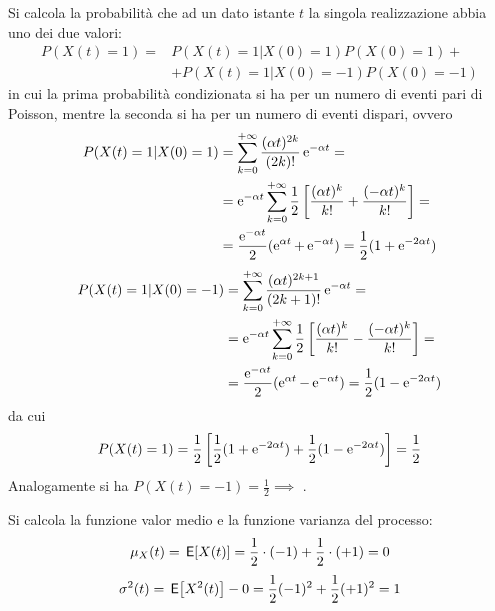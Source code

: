 Si calcola la probabilità che ad un dato istante $t$ la singola realizzazione abbia uno dei due valori:
\begin{equation}\begin{split}P(X(t)=1)=&P(X(t)=1|X(0)=1)P(X(0)=1)+\\&+P(X(t)=1|X(0)=-1)P(X(0)=-1)\end{split}\end{equation}
in cui la prima probabilità condizionata si ha per un numero di eventi pari di Poisson, mentre la seconda si ha per un numero di eventi dispari, ovvero
\begin{equation}\begin{split}P(X(t)=1|X(0)=1)&=\sum_{k=0}^{+\infty}{\frac{(\alpha t)^{2k}}{(2k)!}\operatorname{e}^{-\alpha t}}=\\
&=\operatorname{e}^{-\alpha t}\sum_{k=0}^{+\infty}{\frac{1}{2}\left[\frac{(\alpha t)^k}{k!}+\frac{(-\alpha t)^k}{k!}\right]}=\\
&=\frac{\operatorname{e}^{-\alpha t}}{2}(\operatorname{e}^{\alpha t}+\operatorname{e}^{-\alpha t})=\frac{1}{2}(1+\operatorname{e}^{-2\alpha t})
\end{split}\end{equation}
\begin{equation}\begin{split}P(X(t)=1|X(0)=-1)&=\sum_{k=0}^{+\infty}{\frac{(\alpha t)^{2k+1}}{(2k+1)!}\operatorname{e}^{-\alpha t}}=\\
&=\operatorname{e}^{-\alpha t}\sum_{k=0}^{+\infty}{\frac{1}{2}\left[\frac{(\alpha t)^k}{k!}-\frac{(-\alpha t)^k}{k!}\right]}=\\
&=\frac{\operatorname{e}^{-\alpha t}}{2}(\operatorname{e}^{\alpha t}-\operatorname{e}^{-\alpha t})=\frac{1}{2}(1-\operatorname{e}^{-2\alpha t})
\end{split}\end{equation}
da cui
\begin{equation}P(X(t)=1)=\frac{1}{2}\left[\frac{1}{2}(1+\operatorname{e}^{-2\alpha t})+\frac{1}{2}(1-\operatorname{e}^{-2\alpha t})\right]=\frac{1}{2}\end{equation}
Analogamente si ha $P(X(t)=-1)=\frac{1}{2} \implies$ .

Si calcola la funzione valor medio e la funzione varianza del processo:
\begin{equation}\mu_X(t)=\,{\operatorname{\mathsf{E}}}\!\left[{X(t)}\right]=\frac{1}{2}\cdot(-1)+\frac{1}{2}\cdot(+1)=0\end{equation}
\begin{equation}\sigma^2(t)=\,{\operatorname{\mathsf{E}}}\!\left[{X^2(t)}\right]-0=\frac{1}{2}(-1)^2+\frac{1}{2}(+1)^2=1\end{equation}

